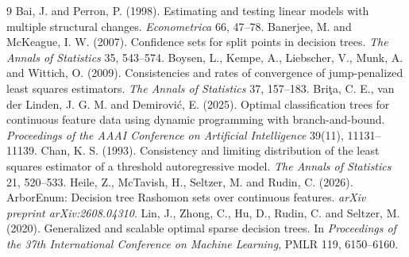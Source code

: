 \documentclass[11pt]{article}
\theoremstyle{plain}
\theoremstyle{definition}
\theoremstyle{remark}
\begin{document}
\begin{thebibliography}{9}
%
 Bai, J. and Perron, P. (1998).
  Estimating and testing linear models with multiple structural changes.
  \emph{Econometrica} 66, 47--78.
 Banerjee, M. and McKeague,
  I. W. (2007). Confidence sets for split points in decision trees.
  \emph{The Annals of Statistics} 35, 543--574.
 Boysen, L., Kempe, A., Liebscher,
  V., Munk, A. and Wittich, O. (2009). Consistencies and rates of convergence
  of jump-penalized least squares estimators. \emph{The Annals of Statistics}
  37, 157--183.
 Bri\c{t}a, C. E., van der
  Linden, J. G. M. and Demirovi\'c, E. (2025). Optimal classification trees
  for continuous feature data using dynamic programming with
  branch-and-bound. \emph{Proceedings of the AAAI Conference on Artificial
  Intelligence} 39(11), 11131--11139.
 Chan, K. S. (1993). Consistency and limiting
  distribution of the least squares estimator of a threshold autoregressive
  model. \emph{The Annals of Statistics} 21, 520--533.
 Heile, Z., McTavish, H.,
  Seltzer, M. and Rudin, C. (2026). ArborEnum: Decision tree Rashomon sets
  over continuous features. \emph{arXiv preprint arXiv:2608.04310}.
 Lin, J., Zhong, C., Hu, D., Rudin,
  C. and Seltzer, M. (2020). Generalized and scalable optimal sparse
  decision trees. In \emph{Proceedings of the 37th International Conference
  on Machine Learning}, PMLR 119, 6150--6160.

\end{thebibliography}
\end{document}
